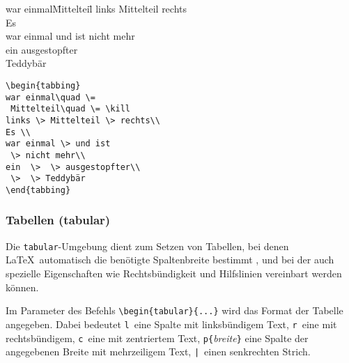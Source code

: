 
%
\exa
\begin{tabbing}
war einmal\quad \=
 Mittelteil\quad \= \kill
links \> Mittelteil \> rechts\\
Es \\
war einmal \> und ist
 \> nicht mehr\\
ein  \>  \> ausgestopfter\\
 \>  \> Teddybär
\end{tabbing}
\exb
\begin{verbatim}
\begin{tabbing}
war einmal\quad \=
 Mittelteil\quad \= \kill
links \> Mittelteil \> rechts\\
Es \\
war einmal \> und ist
 \> nicht mehr\\
ein  \>  \> ausgestopfter\\
 \>  \> Teddybär
\end{tabbing}
\end{verbatim}
\exc


\subsubsection{Tabellen (tabular)} \label{tabular}
 
Die \texttt{tabular}-Umgebung dient zum Setzen von Tabellen, bei
denen \LaTeX\ automatisch die benötigte Spaltenbreite
bestimmt
, und bei der auch spezielle Eigenschaften wie
Rechtsbündigkeit und Hilfslinien vereinbart werden können.
 
Im Parameter des Befehls \lstinline|\begin{tabular}{...}| wird das
Format der Tabelle angegeben.
Dabei bedeutet
\texttt{l}~eine Spalte mit linksbündigem Text,
\texttt{r}~eine mit rechtsbündigem,
\texttt{c}~eine mit zentriertem Text,
\lstinline|p{|\textit{breite}\lstinline|}| eine Spalte der angegebenen
Breite mit mehrzeiligem Text,
\lstinline.|.~einen senkrechten Strich.
 
